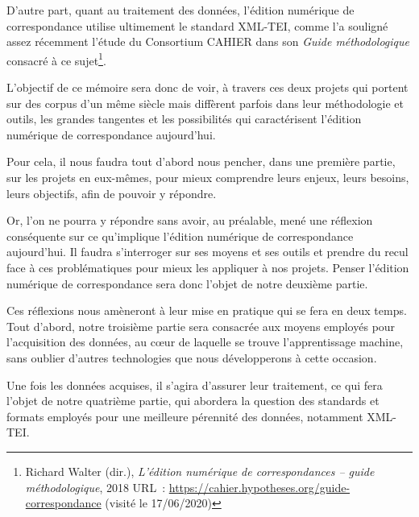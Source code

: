 D'autre part, quant au traitement des données, l'édition numérique de correspondance utilise ultimement le standard XML-TEI, comme l'a souligné assez récemment l'étude du Consortium CAHIER dans son \emph{Guide méthodologique} consacré à ce sujet\footnote{ Richard Walter (dir.), \emph{L’édition numérique de correspondances – guide méthodologique}, 2018 URL :  \url{https://cahier.hypotheses.org/guide-correspondance} (visité le 17/06/2020)}.

L'objectif de ce mémoire sera donc de voir, à travers ces deux projets qui portent sur des corpus d'un même siècle mais diffèrent parfois dans leur méthodologie et outils, les grandes tangentes et les possibilités qui caractérisent l'édition numérique de correspondance aujourd'hui.

Pour cela, il nous faudra tout d'abord nous pencher, dans une première partie, sur les projets en eux-mêmes, pour mieux comprendre leurs enjeux, leurs besoins, leurs objectifs, afin de pouvoir y répondre.

Or, l'on ne pourra y répondre sans avoir, au préalable, mené une réflexion conséquente sur ce qu'implique l'édition numérique de correspondance aujourd'hui. Il faudra s'interroger sur ses moyens et ses outils et prendre du recul face à ces problématiques pour mieux les appliquer à nos projets. Penser l'édition numérique de correspondance sera donc l'objet de notre deuxième partie.

 Ces réflexions nous amèneront à leur mise en pratique qui se fera en deux temps. Tout d'abord, notre troisième partie sera consacrée aux moyens employés pour l'acquisition des données, au c\oe ur de laquelle se trouve l'apprentissage machine, sans oublier d'autres technologies que nous développerons à cette occasion.
 
 Une fois les données acquises, il s'agira d'assurer leur traitement, ce qui fera l'objet de notre quatrième partie, qui abordera la question des standards et formats employés pour une meilleure pérennité des données, notamment XML-TEI.

